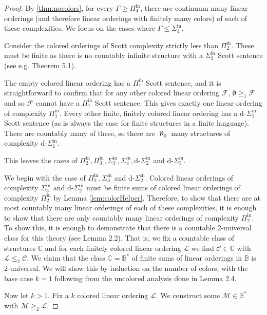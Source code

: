 \documentclass[11pt]{amsart}
\newcommand{\C}{\mathcal{C}}
\newcommand{\mc}[1]{\mathcal{#1}}
\newcommand{\Pinf}[1]{\Pi^{\mathrm{in}}_{#1}}
\newcommand{\Sinf}[1]{\Sigma^{\mathrm{in}}_{#1}}
\def\C{\mathcal{C}}
\theoremstyle{remark}
\begin{document}
\begin{proof}
    By \cref{thm:nocolors}, for every $\Gamma\geq\Pinf{4}$, there are continuum many linear orderings (and therefore linear orderings with finitely many colors) of each of these complexities.
    We focus on the cases where $\Gamma\leq \Sinf{4}$.

	Consider the colored orderings of Scott complexity strictly less than $\Pinf{2}$. These must be finite as there is no countably infinite structure with a $\Sinf{2}$ Scott sentence (see e.g. \cite{AGNHTT} Theorem 5.1).


	The empty colored linear ordering has a $\Pinf{1}$ Scott sentence, and it is straightforward to confirm that for any other colored linear ordering $\mc{F}$, $\emptyset\geq_1 \mc{F}$ and so $\mc F$ cannot have a $\Pinf{1}$ Scott sentence.
    This gives exactly one linear ordering of complexity $\Pinf{1}$.
    Every other finite, finitely colored linear ordering has a $\text{d-}\Sinf{1}$ Scott sentence (as is always the case for finite structures in a finite language).
    There are countably many of these, so there are $\aleph_0$ many structures of complexity $\text{d-}\Sinf{1}$.

  

    This leaves the cases of $\Pinf{2},\Pinf{3},\Sinf{3},\Sinf{4},\text{d-}\Sinf{2}$ and $\text{d-}\Sinf{3}$.

    We begin with the case of $\Pinf{2}, \Sinf{3}$ and $\text{d-}\Sinf{2}$.
    Colored linear orderings of complexity $\Sinf{3}$ and $\text{d-}\Sinf{2}$ must be finite sums of colored linear orderings of complexity $\Pinf{2}$ by Lemma \ref{lem:colorHelper}.
    Therefore, to show that there are at most countably many linear orderings of each of these complexities, it is enough to show that there are only countably many linear orderings of complexity $\Pinf{2}$.
    To show this, it is enough to demonstrate that there is a countable 2-universal class for this theory (see \cite{GR23} Lemma 2.2).
    That is, we fix a countable class of structures $\mathbb{C}$ and for each finitely colored linear ordering $\mc{L}$ we find $\C\in\mathbb{C}$ with $\mc{L}\leq_2\C$.
    We claim that the class $\mathbb{C}=\mathbb{B}^*$ of finite sums of linear orderings in $\mathbb{B}$ is 2-universal.
    We will show this by induction on the number of colors, with the base case $k=1$ following from the uncolored analysis done in \cite{GR23} Lemma 2.4.
    
    Now let $k>1$.
    Fix a $k$ colored linear ordering $\mc{L}$.
    We construct some $\mc{M}\in\mathbb{B}^*$ with $\mc{M}\geq_2 \mc{L}$.
    

\end{proof}
\end{document}
